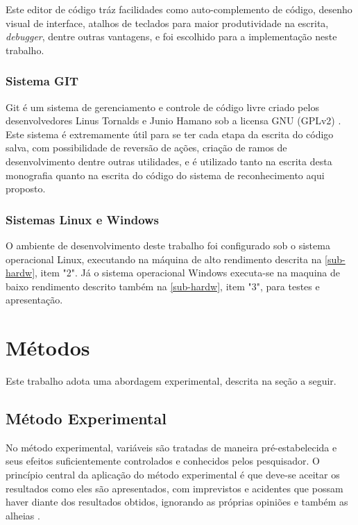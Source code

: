 Este editor de código tráz facilidades como auto-complemento de código, desenho visual de interface, atalhos de teclados para maior produtividade na escrita, \textit{debugger}, dentre outras vantagens, e foi escolhido para a implementação neste trabalho.

\subsubsection{Sistema GIT}\label{subsec:git}
Git é um sistema de gerenciamento e controle de código livre criado pelos desenvolvedores Linus Tornalds e Junio Hamano sob a licensa GNU (GPLv2) \cite{git}. Este sistema é extremamente útil para se ter cada etapa da escrita do código salva, com possibilidade de reversão de ações, criação de ramos de desenvolvimento dentre outras utilidades, e é utilizado tanto na escrita desta monografia quanto na escrita do código do sistema de reconhecimento aqui proposto.

\subsubsection{Sistemas Linux e Windows}\label{subsec:linux}
O ambiente de desenvolvimento deste trabalho foi configurado sob o sistema operacional Linux, executando na máquina de alto rendimento descrita na \autoref{sub-hardw}, item "2". Já o sistema operacional Windows executa-se na maquina de baixo rendimento descrito também na \autoref{sub-hardw}, item "3", para testes e apresentação.


\section{Métodos}\label{sec:metodos}
Este trabalho adota uma abordagem experimental, descrita na seção a seguir.


\subsection{Método Experimental}\label{metex}

No método experimental, variáveis são tratadas de maneira pré-estabelecida e seus efeitos suficientemente controlados  e conhecidos pelos pesquisador. O princípio central da aplicação do método experimental é que deve-se aceitar os resultados como eles são apresentados, com imprevistos e acidentes que possam haver diante dos resultados obtidos, ignorando as próprias opiniões e também as alheias \cite{fachin-metodos}.

